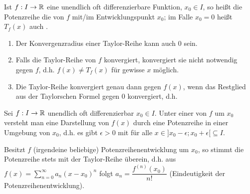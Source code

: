 \Def Ist $f:I\to\mathbb{R}$ eine unendlich oft differenzierbare Funktion, $x_0\in I$, so heißt die Potenzreihe
die  von $f$ mit/im Entwicklungspunkt $x_0$; im Falle $x_0=0$ heißt $T_f(x)$ auch .

\Beachte\quad
\begin{enumerate}
	\item Der Konvergenzradius einer Taylor-Reihe kann auch $0$ sein.
	
	\item Falls die Taylor-Reihe von $f$ konvergiert, konvergiert sie nicht notwendig gegen $f$, d.h. $f(x)\ne T_f(x)$ für gewisse $x$ möglich.
	
	\item Die Taylor-Reihe konvergiert genau dann gegen $f(x)$, wenn das Restglied aus der Taylorschen Formel gegen $0$ konvergiert, d.h. 
\end{enumerate}

\Def Sei $f:I\to\mathbb{R}$ unendlich oft differenzierbar $x_0\in I$. Unter einer  von $f$ um $x_0$ versteht man eine Darstellung von $f(x)$ durch eine Potenzreihe in einer Umgebung von $x_0$, d.h. es gibt $\epsilon>0$ mit
für alle $x\in{]x_0-\epsilon;x_0+\epsilon[}\subseteq I$.


\Bem Besitzt $f$ (irgendeine beliebige) Potenzreihenentwicklung um $x_0$, so stimmt die Potenzreihe stets mit der Taylor-Reihe überein, d.h. aus $f(x)=\sum\limits_{n=0}^{\infty}a_n(x-x_0)^n$ folgt $a_n=\dfrac{f^{(n)}(x_0)}{n!}$ (Eindeutigkeit der Potenzreihenentwicklung).


